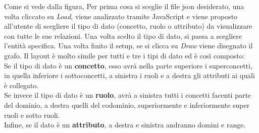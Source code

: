 \documentclass[Lau,binding=0.6cm]{sapthesis}
\begin{document}
Come si vede dalla figura, Per prima cosa si sceglie il file json desiderato, una volta cliccato su \textit{Load}, viene analizzato tramite JavaScript e viene proposto all'utente di scegliere il tipo di dato (concetto, ruolo o attributo) da visualizzare con tutte le sue relazioni. Una volta scelto il tipo di dato, si passa a scegliere l'entità specifica. Una volta finito il setup, se si clicca su \textit{Draw} viene disegnato il grafo. Il layout è molto simile per tutti e tre i tipi di dato ed è così composto: 
\\Se il tipo di dato è un \textbf{concetto}, esso avrà nella parte superiore i superconcetti, in quella inferiore i sottoconcetti, a sinistra i ruoli e a destra gli attributi ai quali è collegato.
\\Se invece il tipo di dato è un \textbf{ruolo}, avrà a sinistra tutti i concetti facenti parte del dominio, a destra quelli del codominio, superiormente e inferiormente super ruoli e sotto ruoli.
\\Infine, se il dato è un \textbf{attributo}, a destra e sinistra andranno domini e range.
\end{document}
